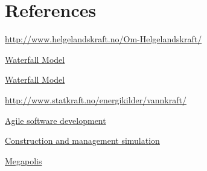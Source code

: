 \section{References}

\begin{thebibliography}{99}

	\href {http://www.helgelandskraft.no/Om-Helgelandskraft/}{http://www.helgelandskraft.no/Om-Helgelandskraft/}

	\href {http://en.wikipedia.org/wiki/Waterfall_model}{Waterfall Model}

	\href {http://searchsoftwarequality.techtarget.com/definition/waterfall-model}{Waterfall Model}

	\href {http://www.statkraft.no/energikilder/vannkraft/}{http://www.statkraft.no/energikilder/vannkraft/}

	\href {http://en.wikipedia.org/wiki/Agile_software_development}{Agile software development}

	\href {http://en.wikipedia.org/wiki/Construction_and_management_simulation}{Construction and management simulation}

	\href {https://play.google.com/store/apps/details?id=com.socialquantum.acityint}{Megapolis}

\end{thebibliography}